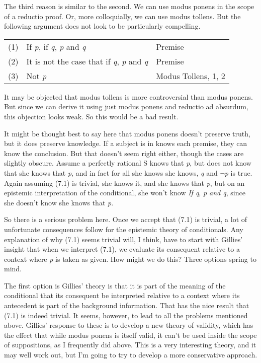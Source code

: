 The third reason is similar to the second. We can use modus ponens in the scope of a reductio proof. Or, more colloquially, we can use modus tollens. But the following argument does not look to be particularly compelling.

\bigskip
\begin{tabular}{r l l}
(1)&If \textit{p}, if \textit{q}, \textit{p} and \textit{q}&Premise\\

(2)&It is not the case that if \textit{q}, \textit{p} and \textit{q}&Premise\\

(3)&Not \textit{p}&Modus Tollens, 1, 2\\
\end{tabular}
\bigskip


\noindent It may be objected that modus tollens is more controversial than modus ponens. But since we can derive it using just modus ponens and reductio ad absurdum, this objection looks weak. So this would be a bad result.

It might be thought best to say here that modus ponens doesn't preserve truth, but it does preserve knowledge. If a subject is in knows each premise, they can know the conclusion. But that doesn't seem right either, though the cases are slightly obscure. Assume a perfectly rational S knows that \textit{p}, but does not know that she knows that \textit{p}, and in fact for all she knows she knows, \textit{q} and \(\neg\){}\textit{p} is true. Again assuming (7.1) is trivial, she knows it, and she knows that \textit{p}, but on an epistemic interpretation of the conditional, she won't know \textit{If q}, \textit{p and q}, since she doesn't know she knows that \textit{p}.

So there is a serious problem here. Once we accept that (7.1) is trivial, a lot of unfortunate consequences follow for the epistemic theory of conditionals. Any explanation of why (7.1) seems trivial will, I think, have to start with Gillies' insight that when we interpret (7.1), we evaluate its consequent relative to a context where \textit{p} is taken as given. How might we do this? Three options spring to mind.

The first option is Gillies' theory is that it is part of the meaning of the conditional that its consequent be interpreted relative to a context where its antecedent is part of the background information. That has the nice result that (7.1) is indeed trivial. It seems, however, to lead to all the problems mentioned above. Gillies' response to these is to develop a new theory of validity, which has the effect that while modus ponens is itself valid, it can't be used inside the scope of suppositions, as I frequently did above. This is a very interesting theory, and it may well work out, but I'm going to try to develop a more conservative approach.

